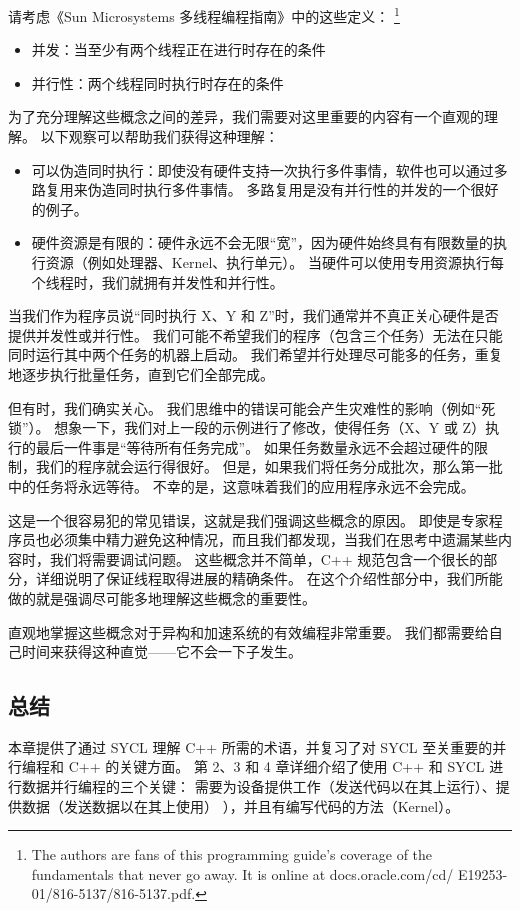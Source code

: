 请考虑《Sun Microsystems 多线程编程指南》中的这些定义：
\footnote{The authors are fans of this programming guide’s coverage of the fundamentals that never go away. It is online at docs.oracle.com/cd/ E19253-01/816-5137/816-5137.pdf.}

\begin{itemize}
	\item 并发：当至少有两个线程正在进行时存在的条件

	\item 并行性：两个线程同时执行时存在的条件
\end{itemize}

为了充分理解这些概念之间的差异，我们需要对这里重要的内容有一个直观的理解。 
以下观察可以帮助我们获得这种理解：

\begin{itemize}
	\item 可以伪造同时执行：即使没有硬件支持一次执行多件事情，软件也可以通过多路复用来伪造同时执行多件事情。 
		多路复用是没有并行性的并发的一个很好的例子。

	\item 硬件资源是有限的：硬件永远不会无限“宽”，因为硬件始终具有有限数量的执行资源（例如处理器、Kernel、执行单元）。 
	当硬件可以使用专用资源执行每个线程时，我们就拥有并发性和并行性。
\end{itemize}

当我们作为程序员说“同时执行 X、Y 和 Z”时，我们通常并不真正关心硬件是否提供并发性或并行性。 
我们可能不希望我们的程序（包含三个任务）无法在只能同时运行其中两个任务的机器上启动。 
我们希望并行处理尽可能多的任务，重复地逐步执行批量任务，直到它们全部完成。

但有时，我们确实关心。 我们思维中的错误可能会产生灾难性的影响（例如“死锁”）。 
想象一下，我们对上一段的示例进行了修改，使得任务（X、Y 或 Z）执行的最后一件事是“等待所有任务完成”。 
如果任务数量永远不会超过硬件的限制，我们的程序就会运行得很好。 
但是，如果我们将任务分成批次，那么第一批中的任务将永远等待。 不幸的是，这意味着我们的应用程序永远不会完成。

这是一个很容易犯的常见错误，这就是我们强调这些概念的原因。 
即使是专家程序员也必须集中精力避免这种情况，而且我们都发现，当我们在思考中遗漏某些内容时，我们将需要调试问题。 
这些概念并不简单，C++ 规范包含一个很长的部分，详细说明了保证线程取得进展的精确条件。 
在这个介绍性部分中，我们所能做的就是强调尽可能多地理解这些概念的重要性。

直观地掌握这些概念对于异构和加速系统的有效编程非常重要。 我们都需要给自己时间来获得这种直觉——它不会一下子发生。

\subsection{总结}
本章提供了通过 SYCL 理解 C++ 所需的术语，并复习了对 SYCL 至关重要的并行编程和 C++ 的关键方面。 
第 2、3 和 4 章详细介绍了使用 C++ 和 SYCL 进行数据并行编程的三个关键：
需要为设备提供工作（发送代码以在其上运行）、提供数据（发送数据以在其上使用） ），并且有编写代码的方法（Kernel）。